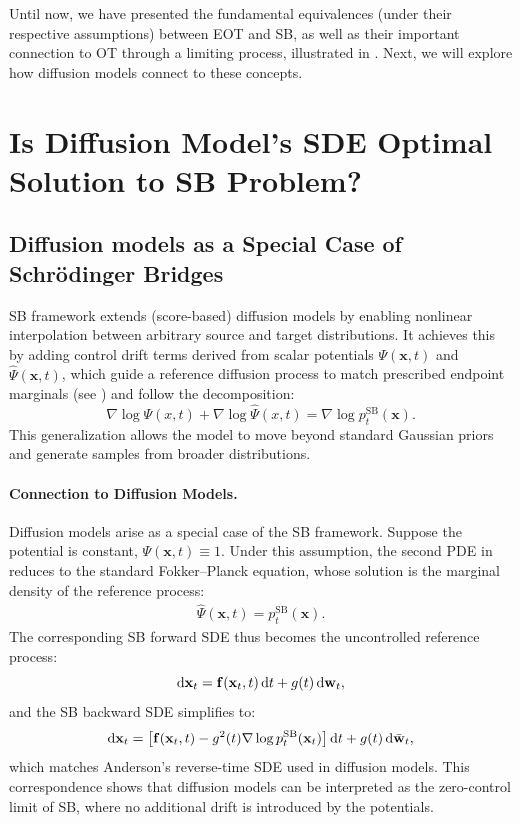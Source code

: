 Until now, we have presented the fundamental equivalences (under their respective assumptions) between EOT and SB, as well as their important connection to OT through a limiting process, illustrated in . Next, we will explore how diffusion models connect to these concepts.

\newpage

\section{Is Diffusion Model's SDE Optimal Solution to SB Problem?}\label{sec:dm-and-sb}


\subsection{Diffusion models as a Special Case of Schrödinger Bridges}

SB framework extends (score-based) diffusion models by enabling nonlinear interpolation between arbitrary source and target distributions. It achieves this by adding control drift terms derived from scalar potentials $\Psi(\mathbf{x}, t)$ and $\widehat{\Psi}(\mathbf{x}, t)$, which guide a reference diffusion process to match prescribed endpoint marginals (see ) and follow the decomposition:
\[
\nabla\log{\Psi(x,t)}+\nabla\log{\hat{\Psi}(x,t)}=\nabla \log p_t^{\mathrm{SB}}(\mathbf{x}).
\]
This generalization allows the model to move beyond standard Gaussian priors and generate samples from broader distributions.

\paragraph{Connection to Diffusion Models.}

Diffusion models arise as a special case of the SB framework. Suppose the potential is constant, $\Psi(\mathbf{x}, t) \equiv 1$. Under this assumption, the second PDE in  reduces to the standard Fokker–Planck equation, whose solution is the marginal density of the reference process:
\begin{align}\label{eq:sb-backward-potential}
    \widehat{\Psi}(\mathbf{x}, t) = p_t^{\mathrm{SB}}(\mathbf{x}).
\end{align}
The corresponding SB forward SDE thus becomes the uncontrolled reference process:
\[
    \mathop{}\!\mathrm{d}\mathbf{x}_t = \mathbf{f}(\mathbf{x}_t, t)\mathop{}\!\mathrm{d} t + g(t)\mathop{}\!\mathrm{d}\mathbf{w}_t,
\]
and the SB backward SDE simplifies to:
\[
    \mathop{}\!\mathrm{d}\mathbf{x}_t = \left[\mathbf{f}(\mathbf{x}_t, t) - g^2(t) \nabla \log p_t^{\mathrm{SB}}(\mathbf{x}_t) \right]\mathop{}\!\mathrm{d} t + g(t)\mathop{}\!\mathrm{d}\bar{\mathbf{w}}_t,
\]
which matches Anderson’s reverse-time SDE used in diffusion models. This correspondence shows that diffusion models can be interpreted as the zero-control limit of SB, where no additional drift is introduced by the potentials.

